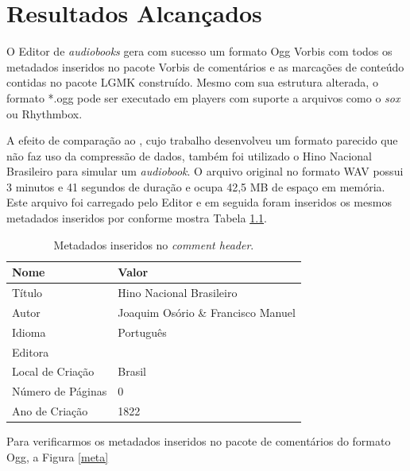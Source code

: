 \chapter[Resultados Alcançados]{Resultados Alcançados}\label{cap4}


O Editor de \textit{audiobooks} gera com sucesso um formato Ogg Vorbis com todos os metadados inseridos no pacote Vorbis de comentários e as marcações de conteúdo contidas no pacote LGMK construído. Mesmo com sua estrutura alterada, o formato *.ogg pode ser executado em players com suporte a arquivos como o \textit{sox} ou Rhythmbox.

A efeito de comparação ao \cite{herbert}, cujo trabalho desenvolveu um formato parecido que não faz uso da compressão de dados, também foi utilizado o Hino Nacional Brasileiro para simular um \textit{audiobook}. O arquivo original no formato WAV possui 3 minutos e 41 segundos de duração e ocupa 42,5 MB de espaço em memória. Este arquivo foi carregado pelo Editor e em seguida foram inseridos os mesmos metadados inseridos por \cite{herbert} conforme mostra Tabela \ref{tab1}.

\begin{table}[ht]
\centering
\caption{Metadados inseridos no \textit{comment header}.}
\vspace{0.5cm}
\begin{tabular}{ll}

\hline
\textbf{Nome} & \textbf{Valor} \\
\hline
Título & Hino Nacional Brasileiro \\
Autor & Joaquim Osório \& Francisco Manuel \\
Idioma & Português \\
Editora & \\
Local de Criação & Brasil \\
Número de Páginas & 0 \\
Ano de Criação & 1822 \\
\hline

\end{tabular}
\label{tab1}
\end{table}

Para verificarmos os metadados inseridos no pacote de comentários do formato Ogg, a Figura \ref{meta}

